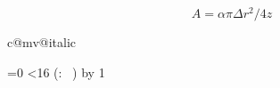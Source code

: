 \documentclass{article}
\begin{document}
\lipsum[1]

\[ A = \alpha \pi  \Delta r^2/4 \mathit{z}\]


\expandafter\the\csname c@mv@italic\endcsname 
\newcommand{\PrintMathFonts}{%
  \count255=0
  \loop\ifnum\count255<16
    (\the\count255:~\fontname\textfont\count255 )
    \advance{} by 1
 \repeat}


\PrintMathFonts
\end{document}
